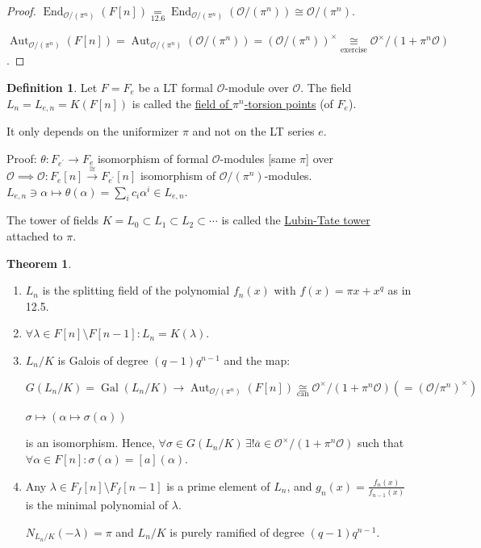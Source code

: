 \documentclass[openany]{amsbook}
\numberwithin{section}{chapter}
\theoremstyle{definition}
\newtheorem*{definition}{Definition}
\newtheorem{theorem}{Theorem}[chapter]
\begin{document}
\begin{proof}
    \(\operatorname{End}_{\mathcal{O} / (\pi^n)} (F[n]) \underset{12.6}{=} \operatorname{End}_{\mathcal{O} / (\pi^n)} (\mathcal{O} / (\pi^n)) \cong \mathcal{O} / (\pi^n)\). 

    \(\operatorname{Aut}_{\mathcal{O}/(\pi^n)}(F[n]) = \operatorname{Aut}_{\mathcal{O}/(\pi^n)}(\mathcal{O} / (\pi^n)) = (\mathcal{O} / (\pi^n))^\times \underset{\text{exercise}}{\cong} \mathcal{O}^\times / (1 + \pi^n \mathcal{O})\).
\end{proof}
\begin{definition}
    Let \(F = F_e\) be a LT formal \(\mathcal{O}\)-module over \(\mathcal{O}\). The field \(L_n = L_{e,n} = K(F[n])\) is called the \underline{field of \(\pi^n\)-torsion points} (of \(F_e\)).
    
    It only depends on the uniformizer \(\pi\) and not on the LT series \(e\). 

    Proof: \(\theta : F_{e^{\prime}} \to F_e\) isomorphism of formal \(\mathcal{O}\)-modules [same \(\pi\)] over \(\mathcal{O} \implies \mathcal{O} : F_e[n] \overset{\cong}{\to} F_{e^{\prime}}[n]\) isomorphism of \(\mathcal{O} / (\pi^n)\)-modules. \(L_{e,n} \ni \alpha \mapsto \theta (\alpha) = \sum_{i} c_i \alpha^i \in L_{e,n}\).
\end{definition}

The tower of fields \(K = L_0 \subset L_1 \subset L_2 \subset \cdots \) is called the \underline{Lubin-Tate tower} attached to \(\pi\).

\begin{theorem}
    \begin{enumerate}[label=\roman*)]
        \item \(L_n\) is the splitting field of the polynomial \(f_n(x)\) with \(f(x) = \pi x + x^q\) as in 12.5.
        \item \(\forall \lambda \in F[n] \setminus F[n-1]: L_n = K(\lambda)\).
        \item \(L_n / K\) is Galois of degree \((q-1)q^{n-1} \) and the map:
        
        \[
            G(L_n / K) = \operatorname{Gal} (L_n / K) \to \operatorname{Aut}_{\mathcal{O} / (\pi^n)}(F[n]) \underset{\text{can}}{\cong} \mathcal{O}^\times / (1 + \pi^n \mathcal{O}) (= (\mathcal{O} / \pi^n)^\times)
        \]

        \(\sigma \mapsto (\alpha \mapsto \sigma(\alpha))\)

        is an isomorphism. Hence, \(\forall \sigma \in G(L_n / K) \, \exists ! \overline{a} \in \mathcal{O}^\times / (1+\pi^n \mathcal{O})\) such that \(\forall \alpha \in F[n]: \sigma (\alpha) = [a](\alpha)\).
        
        \item Any \(\lambda \in F_f[n] \setminus F_f[n-1]\) is a prime element of \(L_n\), and \(g_n(x) = \frac{f_n(x)}{f_{n-1} (x)}\) is the minimal polynomial of \(\lambda\).
        
        \(N_{L_n / K}(-\lambda) = \pi\) and \(L_n / K\) is purely ramified of degree \((q-1)q^{n-1}\).
    \end{enumerate} 
\end{theorem}
\end{document}
